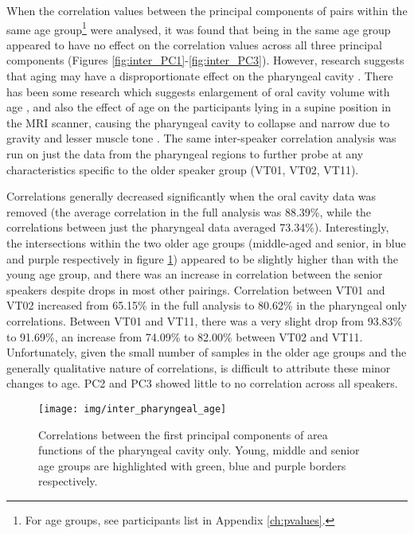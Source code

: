 When the correlation values between the principal components of pairs within the same age group\footnote{For age groups, see participants list in Appendix \ref{ch:pvalues}.} were analysed, it was found that being in the same age group appeared to have no effect on the correlation values across all three principal components (Figures \ref{fig:inter_PC1}-\ref{fig:inter_PC3}). However, research suggests that aging may have a disproportionate effect on the pharyngeal cavity \cite{xue1999age}. There has been some research which suggests enlargement of oral cavity volume with age \cite{xue2003changes}, and also the effect of age on the participants lying in a supine position in the MRI scanner, causing the pharyngeal cavity to collapse and narrow due to gravity and lesser muscle tone \cite{martin1997effect}. The same inter-speaker correlation analysis was run on just the data from the pharyngeal regions to further probe at any characteristics specific to the older speaker group (VT01, VT02, VT11).

Correlations generally decreased significantly when the oral cavity data was removed (the average correlation in the full analysis was 88.39\%, while the correlations between just the pharyngeal data averaged 73.34\%). Interestingly, the intersections within the two older age groups (middle-aged and senior, in blue and purple respectively in figure \ref{fig:inter_pharyngeal_age}) appeared to be slightly higher than with the young age group, and there was an increase in correlation between the senior speakers despite drops in most other pairings. Correlation between VT01 and VT02 increased from 65.15\% in the full analysis to 80.62\% in the pharyngeal only correlations. Between VT01 and VT11, there was a very slight drop from 93.83\% to 91.69\%, an increase from 74.09\% to 82.00\% between VT02 and VT11. Unfortunately, given the small number of samples in the older age groups and the generally qualitative nature of correlations, is difficult to attribute these minor changes to age. PC2 and PC3 showed little to no correlation across all speakers.

\begin{figure}[H]
    \centering
    \texttt{[image: img/inter\_pharyngeal\_age]}
    \caption{Correlations between the first principal components of area functions of the pharyngeal cavity only. Young, middle and senior age groups are highlighted with green, blue and purple borders respectively.}
    \label{fig:inter_pharyngeal_age}
\end{figure}


